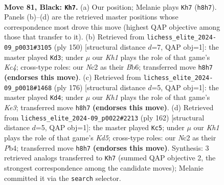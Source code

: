 \documentclass[11pt]{article}
\begin{document}
\clearpage

\begin{figure}[p]\centering
\begin{subfigure}{0.46\textwidth}\centering
\resizebox{\linewidth}{!}{%
\newchessgame
\chessboard[
  setfen={7k/8/8/8/2b2B2/7K/2n2P2/8 b - - 8 81},
  showmover=false,
  pgfstyle=straightmove, color=movearrow, markmove={h8-h7}
]}
\caption{}
\end{subfigure}\hfill
\begin{subfigure}{0.46\textwidth}\centering
\resizebox{\linewidth}{!}{%
\newchessgame
\chessboard[
  setfen={8/8/1B6/4bk2/2K5/5p2/8/8 w - - 0 76},
  showmover=false,
  pgfstyle=straightmove, color=movearrow, markmove={c4-d3}
]}
\caption{}
\end{subfigure}
\\[4pt]
\begin{subfigure}{0.46\textwidth}\centering
\resizebox{\linewidth}{!}{%
\newchessgame
\chessboard[
  setfen={8/8/8/8/8/1b2K1p1/8/4N2k w - - 4 89},
  showmover=false,
  pgfstyle=straightmove, color=movearrow, markmove={e3-d4}
]}
\caption{}
\end{subfigure}\hfill
\begin{subfigure}{0.46\textwidth}\centering
\resizebox{\linewidth}{!}{%
\newchessgame
\chessboard[
  setfen={8/7b/8/1p1K4/1P6/6B1/8/k7 w - - 40 82},
  showmover=false,
  pgfstyle=straightmove, color=movearrow, markmove={d5-c5}
]}
\caption{}
\end{subfigure}
\caption{\textbf{Move 81, Black: \texttt{Kh7}.} (a) Our position; Melanie plays \texttt{Kh7} (\texttt{h8h7}). Panels (b)--(d) are the retrieved master positions whose correspondence most drove this move (highest QAP objective among those that transfer to it). (b) Retrieved from \texttt{lichess\_elite\_2024-09\_p0031\#3105} (ply 150) [structural distance $d$=7, QAP obj=1]: the master played \texttt{Kd3}; under $\mu$ our \emph{Kh1} plays the role of that game's \emph{Kc4}; cross-type roles: our \emph{N}c2 as their \emph{B}b6; transferred move \texttt{h8h7} \textbf{(endorses this move)}. (c) Retrieved from \texttt{lichess\_elite\_2024-09\_p0018\#1468} (ply 176) [structural distance $d$=5, QAP obj=1]: the master played \texttt{Kd4}; under $\mu$ our \emph{Kh1} plays the role of that game's \emph{Ke3}; transferred move \texttt{h8h7} \textbf{(endorses this move)}. (d) Retrieved from \texttt{lichess\_elite\_2024-09\_p0022\#2213} (ply 162) [structural distance $d$=5, QAP obj=1]: the master played \texttt{Kc5}; under $\mu$ our \emph{Kh1} plays the role of that game's \emph{Kd5}; cross-type roles: our \emph{N}c2 as their \emph{P}b4; transferred move \texttt{h8h7} \textbf{(endorses this move)}. Synthesis: 3 retrieved analogs transferred to \texttt{Kh7} (summed QAP objective 2, the strongest correspondence among the candidate moves); Melanie committed it via the \texttt{search} selector.}
\label{fig:thought-m161}
\end{figure}
\end{document}
